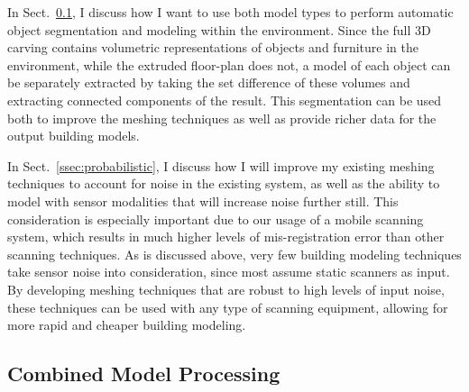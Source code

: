 \documentclass[journal]{IEEEtran}
\begin{document}
In Sect.~\ref{ssec:combined}, I discuss how I want to use both model types to perform automatic object segmentation and modeling within the environment.  Since the full 3D carving contains volumetric representations of objects and furniture in the environment, while the extruded floor-plan does not, a model of each object can be separately extracted by taking the set difference of these volumes and extracting connected components of the result.  This segmentation can be used both to improve the meshing techniques as well as provide richer data for the output building models.

In Sect.~\ref{ssec:probabilistic}, I discuss how I will improve my existing meshing techniques to account for noise in the existing system, as well as the ability to model with sensor modalities that will increase noise further still.  This consideration is especially important due to our usage of a mobile scanning system, which results in much higher levels of mis-registration error than other scanning techniques.  As is discussed above, very few building modeling techniques take sensor noise into consideration, since most assume static scanners as input.  By developing meshing techniques that are robust to high levels of input noise, these techniques can be used with any type of scanning equipment, allowing for more rapid and cheaper building modeling.

\subsection{Combined Model Processing}
\label{ssec:combined}
\end{document}
